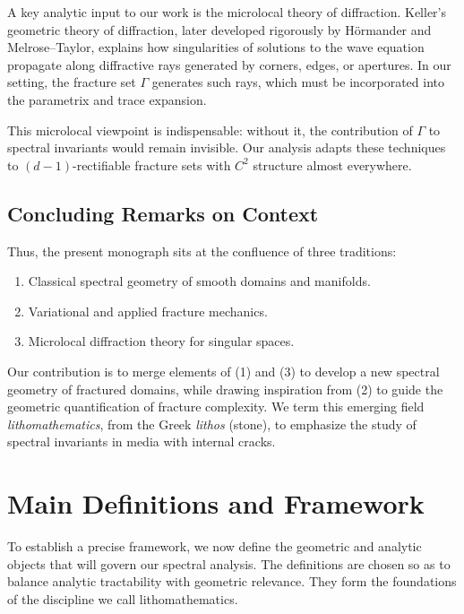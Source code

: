 A key analytic input to our work is the microlocal theory of diffraction. 
Keller’s geometric theory of diffraction, later developed rigorously by 
Hörmander and Melrose–Taylor, explains how singularities of solutions to the 
wave equation propagate along diffractive rays generated by corners, edges, or 
apertures. In our setting, the fracture set $\Gamma$ generates such rays, which 
must be incorporated into the parametrix and trace expansion.

This microlocal viewpoint is indispensable: without it, the contribution of 
$\Gamma$ to spectral invariants would remain invisible. Our analysis adapts 
these techniques to $(d\!-\!1)$-rectifiable fracture sets with $C^2$ structure 
almost everywhere.

\subsection{Concluding Remarks on Context}

Thus, the present monograph sits at the confluence of three traditions:

\begin{enumerate}
  \item Classical spectral geometry of smooth domains and manifolds.
  \item Variational and applied fracture mechanics.
  \item Microlocal diffraction theory for singular spaces.
\end{enumerate}

Our contribution is to merge elements of (1) and (3) to develop a new 
spectral geometry of fractured domains, while drawing inspiration from (2) 
to guide the geometric quantification of fracture complexity. We term this 
emerging field \emph{lithomathematics}, from the Greek \emph{lithos} (stone), 
to emphasize the study of spectral invariants in media with internal cracks.


\section{Main Definitions and Framework}

To establish a precise framework, we now define the geometric and analytic 
objects that will govern our spectral analysis. The definitions are chosen so 
as to balance analytic tractability with geometric relevance. They form the 
foundations of the discipline we call lithomathematics.

